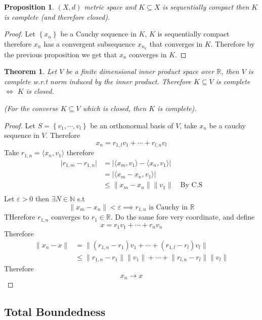 \documentclass[11pt,a4paper]{article}
\theoremstyle{definition}
\theoremstyle{plain}
\newtheorem{theorem}[definition]{Theorem}
\newtheorem{proposition}[definition]{Proposition}
\theoremstyle{remark}
\newcommand{\R}{\mathbb{R}}
\newcommand{\N}{\mathbb{N}}
\renewcommand{\set}[1]{\left\{ #1 \right\}}
\newcommand{\angles}[1]{\langle #1 \rangle}
\newcommand{\abs}[1]{\lvert #1 \rvert}
\newcommand{\norm}[1]{\lVert #1 \rVert}
\begin{document}
\begin{proposition}
    $(X,d)$ metric space and $K \subseteq X$ is sequentially compact then $K$ is complete (and therefore closed). 
\end{proposition}

\begin{proof}
    Let $\set{x_n}$ be a Cauchy sequence in $K$, $K$ is sequentially compact therefore $x_n$ has a convergent subsequence $x_{n_k}$ that converges in $K$. 
    Therefore by the previous proposition we get that $x_n$ converges in $K$. 
\end{proof}

\begin{theorem}
    Let $V$ be a finite dimensional inner product space over $\R$, then $V$ is complete w.r.t norm induced by the inner product. Therefore 
    $K\subseteq V$ is complete $\iff$ $K$ is closed. 
    
    (For the converse $K \subseteq V$ which is closed, then $K$ is complete).
\end{theorem}

\begin{proof}
    Let $S = \set{v_1, \cdots, v_l}$ be an orthonormal basis of $V$, take $x_n$ be a cauchy sequence in $V$. Therefore 
    $$x_n = r_{1,l} v_1 + \cdots + r_{l,n} v_l$$
    Take $r_{1,n} = \angles{x_n, v_1}$ therefore 
    \begin{align*}
        \abs{r_{1,m} - r_{1,n}} &= |\angles{x_{m}, v_1} -\angles{x_n, v_1}| \\
        &= \abs{\angles{x_m - x_n, v_1}} \\
        &\leq \norm{x_m - x_n} \norm{v_1} \quad \text{By C.S} \\ 
    \end{align*}    
    Let $\varepsilon > 0$ then $\exists N \in \N$ s.t 
    $$\norm{x_m - x_n} < \varepsilon \implies r_{1,n} \text{ is Cauchy in $\R$}$$
    THerefore $r_{1,n}$ converges to $r_1 \in \R$. Do the same fore very coordinate, and define 
    $$x = r_1 v_1 + \cdots + r_n v_n$$
    Therefore 
    \begin{align*}
        \norm{x_n - x} &= \norm{(r_{1,n} - r_1) v_1 + \cdots + (r_{1,l} - r_l) v_l} \\
        &\leq \norm{r_{1,n} - r_1} \norm{v_1} + \cdots + \norm{r_{l,n} - r_l} \norm{v_l}
    \end{align*}
    Therefore 
    $$x_n \to x$$
\end{proof}

\subsection{Total Boundedness}
\end{document}
